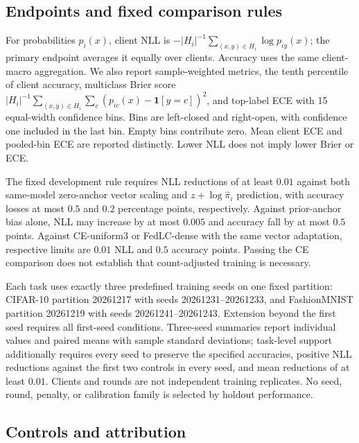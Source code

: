 \subsection{Endpoints and fixed comparison rules}

For probabilities $p_i(x)$, client NLL is $-|H_i|^{-1}\sum_{(x,y)\in H_i}\log p_{iy}(x)$; the primary endpoint averages it equally over clients. Accuracy uses the same client-macro aggregation. We also report sample-weighted metrics, the tenth percentile of client accuracy, multiclass Brier score $|H_i|^{-1}\sum_{(x,y)\in H_i}\sum_c(p_{ic}(x)-\mathbf{1}[y=c])^2$, and top-label ECE with 15 equal-width confidence bins. Bins are left-closed and right-open, with confidence one included in the last bin. Empty bins contribute zero. Mean client ECE and pooled-bin ECE are reported distinctly. Lower NLL does not imply lower Brier or ECE.

The fixed development rule requires NLL reductions of at least $0.01$ against both same-model zero-anchor vector scaling and $z+\log\widehat\pi_i$ prediction, with accuracy losses at most $0.5$ and $0.2$ percentage points, respectively. Against prior-anchor bias alone, NLL may increase by at most $0.005$ and accuracy fall by at most $0.5$ points. Against CE-uniform3 or FedLC-dense with the same vector adaptation, respective limits are $0.01$ NLL and $0.5$ accuracy points. Passing the CE comparison does not establish that count-adjusted training is necessary.

Each task uses exactly three predefined training seeds on one fixed partition: CIFAR-10 partition 20261217 with seeds 20261231--20261233, and FashionMNIST partition 20261219 with seeds 20261241--20261243. Extension beyond the first seed requires all first-seed conditions. Three-seed summaries report individual values and paired means with sample standard deviations; task-level support additionally requires every seed to preserve the specified accuracies, positive NLL reductions against the first two controls in every seed, and mean reductions of at least $0.01$. Clients and rounds are not independent training replicates. No seed, round, penalty, or calibration family is selected by holdout performance.

\subsection{Controls and attribution}

